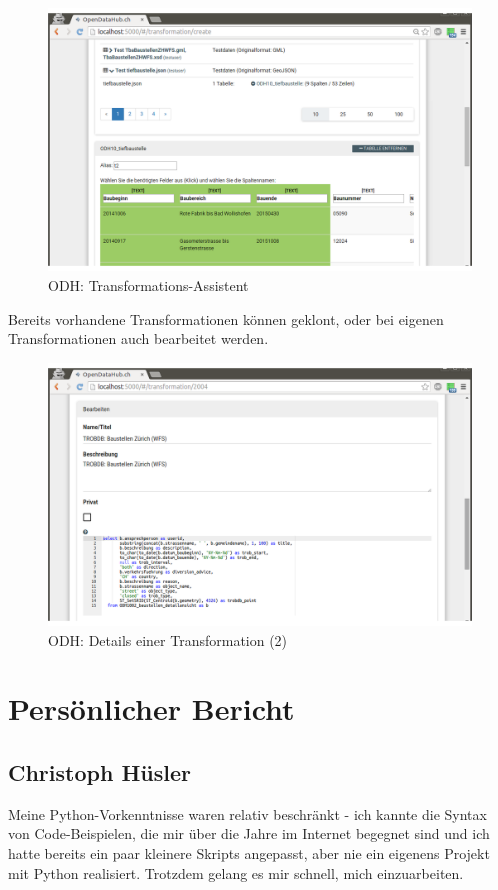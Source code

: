 \begin{figure}[H]
    \centering
    \includegraphics[width=2\linewidth/3]{fig/odh-transformation-assistant}
    \caption{ODH: Transformations-Assistent}
\end{figure}

Bereits vorhandene Transformationen können geklont, oder bei eigenen Transformationen auch bearbeitet werden.

\begin{figure}[H]
    \centering
    \includegraphics[width=2\linewidth/3]{fig/odh-edit-transformation}
    \caption{ODH: Details einer Transformation (2)}
\end{figure}


\section{Persönlicher Bericht}

\subsection{Christoph Hüsler}
Meine Python-Vorkenntnisse waren relativ beschränkt - ich kannte die Syntax von Code-Beispielen, die mir über die Jahre im Internet begegnet sind und ich hatte bereits ein paar kleinere Skripts angepasst, aber nie ein eigenens Projekt mit Python realisiert. Trotzdem gelang es mir schnell, mich einzuarbeiten.

